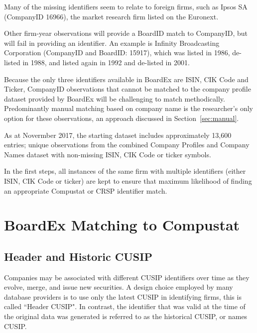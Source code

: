 \documentclass[12pt]{article}
\begin{document}
Many of the missing identifiers seem to relate to foreign firms, such as Ipsos SA (CompanyID 16966), the market research firm listed on the Euronext.

Other firm-year observations will provide a BoardID match to CompanyID, but will fail in providing an identifier.
An example is Infinity Broadcasting Corporation (CompanyID and BoardID: 15917), which was listed in 1986, de-listed in 1988, and listed again in 1992 and de-listed in 2001.

\begin{center}

\end{center}

Because the only three identifiers available in BoardEx are ISIN, CIK Code and Ticker, CompanyID observations that cannot be matched to the company profile dataset provided by BoardEx will be challenging to match methodically.
Predominantly manual matching based on company name is the researcher's only option for these observations, an approach discussed in Section~\ref{sec:manual}.

As at Novermber 2017, the starting dataset includes approximately 13,600 entries; unique observations from the combined Company Profiles and Company Names dataset with non-missing ISIN, CIK Code or ticker symbols.

In the first steps, all instances of the same firm with multiple identifiers (either ISIN, CIK Code or ticker) are kept to ensure that maximum likelihood of finding an appropriate Compustat or CRSP identifier match.


\section{BoardEx Matching to Compustat}\label{sec:BoardexCOMP}

\subsection{Header and Historic CUSIP}\label{sec:HeaderCUSIP}

Companies may be associated with different CUSIP identifiers over time as they evolve, merge, and issue new securities.
A design choice employed by many database providers is to use only the latest CUSIP in identifying firms, this is called ``Header CUSIP".
In contrast, the identifier that was valid at the time of the original data was generated is referred to as the historical CUSIP, or names CUSIP.
\end{document}
